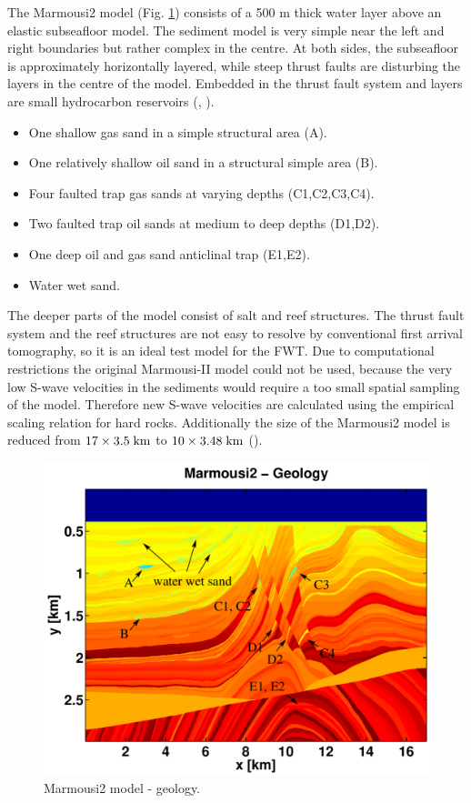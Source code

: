 The Marmousi2 model (Fig. \ref{marmousi_geology}) consists of a 500 m thick water layer above an elastic subseafloor model. The sediment model is very simple near the left and right boundaries but rather complex in the centre. At both sides, the subseafloor is approximately horizontally layered, while steep thrust faults are disturbing the layers in the centre of the model. Embedded in the thrust fault system and layers are small hydrocarbon reservoirs (, \cite{martin:06}). 
\begin{itemize}
\item One shallow gas sand in a simple structural area (A).
\item One relatively shallow oil sand in a structural simple area (B).
\item Four faulted trap gas sands at varying depths (C1,C2,C3,C4).
\item Two faulted trap oil sands at medium to deep depths (D1,D2).
\item One deep oil and gas sand anticlinal trap (E1,E2).
\item Water wet sand.
\end{itemize}
The deeper parts of the model consist of salt and reef structures. The thrust fault system and the reef structures are not easy to resolve by conventional first arrival tomography, so it is an ideal test model for the FWT. Due to computational restrictions the original Marmousi-II model could not be used, because the very low S-wave velocities in the sediments would require a too small spatial sampling of the model. Therefore new S-wave velocities are calculated using the empirical scaling relation for hard rocks. Additionally the size of the Marmousi2 model is reduced from $\rm{17 \times 3.5\;km}$  to $\rm{10 \times 3.48\; km}$ (). 
\begin{figure}[!bh]
\centering
\includegraphics[width=14cm]{figures/marmousi/marmousi_geology.pdf}
\caption{Marmousi2 model - geology.}
\label{marmousi_geology}
\end{figure}
